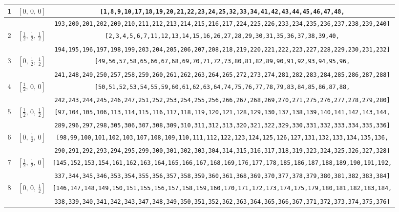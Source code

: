 \documentclass[fleqn,8pt]{jsarticle}
\begin{document}
\begin{longtable}{ccc}
1 & $\left[ 0,\, 0,\, 0 \right]$ & {\tt [1,8,9,10,17,18,19,20,21,22,23,24,25,32,33,34,41,42,43,44,45,46,47,48,} \\ \hline
 &  & {\tt 193,200,201,202,209,210,211,212,213,214,215,216,217,224,225,226,233,234,235,236,237,238,239,240]} \\ \hline
2 & $\left[ \frac{1}{2},\, \frac{1}{2},\, \frac{1}{2} \right]$ & {\tt [2,3,4,5,6,7,11,12,13,14,15,16,26,27,28,29,30,31,35,36,37,38,39,40,} \\ \hline
 &  & {\tt 194,195,196,197,198,199,203,204,205,206,207,208,218,219,220,221,222,223,227,228,229,230,231,232]} \\ \hline
3 & $\left[ 0,\, \frac{1}{2},\, \frac{1}{2} \right]$ & {\tt [49,56,57,58,65,66,67,68,69,70,71,72,73,80,81,82,89,90,91,92,93,94,95,96,} \\ \hline
 &  & {\tt 241,248,249,250,257,258,259,260,261,262,263,264,265,272,273,274,281,282,283,284,285,286,287,288]} \\ \hline
4 & $\left[ \frac{1}{2},\, 0,\, 0 \right]$ & {\tt [50,51,52,53,54,55,59,60,61,62,63,64,74,75,76,77,78,79,83,84,85,86,87,88,} \\ \hline
 &  & {\tt 242,243,244,245,246,247,251,252,253,254,255,256,266,267,268,269,270,271,275,276,277,278,279,280]} \\ \hline
5 & $\left[ \frac{1}{2},\, 0,\, \frac{1}{2} \right]$ & {\tt [97,104,105,106,113,114,115,116,117,118,119,120,121,128,129,130,137,138,139,140,141,142,143,144,} \\ \hline
 &  & {\tt 289,296,297,298,305,306,307,308,309,310,311,312,313,320,321,322,329,330,331,332,333,334,335,336]} \\ \hline
6 & $\left[ 0,\, \frac{1}{2},\, 0 \right]$ & {\tt [98,99,100,101,102,103,107,108,109,110,111,112,122,123,124,125,126,127,131,132,133,134,135,136,} \\ \hline
 &  & {\tt 290,291,292,293,294,295,299,300,301,302,303,304,314,315,316,317,318,319,323,324,325,326,327,328]} \\ \hline
7 & $\left[ \frac{1}{2},\, \frac{1}{2},\, 0 \right]$ & {\tt [145,152,153,154,161,162,163,164,165,166,167,168,169,176,177,178,185,186,187,188,189,190,191,192,} \\ \hline
 &  & {\tt 337,344,345,346,353,354,355,356,357,358,359,360,361,368,369,370,377,378,379,380,381,382,383,384]} \\ \hline
8 & $\left[ 0,\, 0,\, \frac{1}{2} \right]$ & {\tt [146,147,148,149,150,151,155,156,157,158,159,160,170,171,172,173,174,175,179,180,181,182,183,184,} \\ \hline
 &  & {\tt 338,339,340,341,342,343,347,348,349,350,351,352,362,363,364,365,366,367,371,372,373,374,375,376]} \\
\end{longtable}
\end{document}
